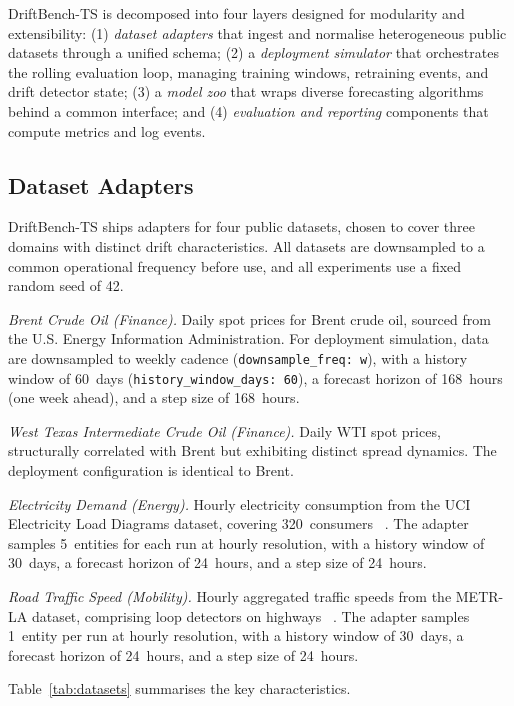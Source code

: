 \documentclass[conference]{IEEEtran}
\begin{document}
DriftBench-TS is decomposed into four layers designed for modularity
and extensibility: (1) \textit{dataset adapters} that ingest and
normalise heterogeneous public datasets through a unified schema;
(2) a \textit{deployment simulator} that orchestrates the rolling
evaluation loop, managing training windows, retraining events, and
drift detector state; (3) a \textit{model zoo} that wraps diverse
forecasting algorithms behind a common interface; and (4)
\textit{evaluation and reporting} components that compute metrics
and log events.

\subsection{Dataset Adapters}

DriftBench-TS ships adapters for four public datasets, chosen to
cover three domains with distinct drift characteristics. All datasets
are downsampled to a common operational frequency before use, and all
experiments use a fixed random seed of 42.

\textit{Brent Crude Oil (Finance).} Daily spot prices for Brent crude
oil, sourced from the U.S. Energy Information Administration. For
deployment simulation, data are downsampled to weekly cadence
(\texttt{downsample\_freq: w}), with a history window of 60~days
(\texttt{history\_window\_days: 60}), a forecast horizon of 168~hours
(one week ahead), and a step size of 168~hours.

\textit{West Texas Intermediate Crude Oil (Finance).} Daily WTI spot
prices, structurally correlated with Brent but exhibiting distinct
spread dynamics. The deployment configuration is identical to Brent.

\textit{Electricity Demand (Energy).} Hourly electricity consumption
from the UCI Electricity Load Diagrams dataset, covering 320~consumers
~\cite{ucielectricity}. The adapter samples 5~entities for each run
at hourly resolution, with a history window of 30~days, a forecast
horizon of 24~hours, and a step size of 24~hours.

\textit{Road Traffic Speed (Mobility).} Hourly aggregated traffic
speeds from the METR-LA dataset, comprising loop detectors on highways
~\cite{li2018dcrnn}. The adapter samples 1~entity per run at hourly
resolution, with a history window of 30~days, a forecast horizon of
24~hours, and a step size of 24~hours.

Table~\ref{tab:datasets} summarises the key characteristics.
\end{document}
